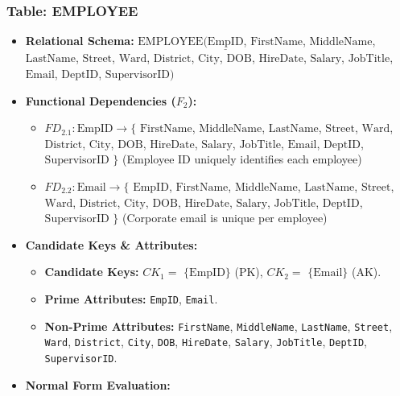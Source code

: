 \documentclass[a4paper,12pt]{report}
\begin{document}
\subsubsection{Table: EMPLOYEE}\label{table-employee}

\begin{itemize}
\item
  \textbf{Relational Schema:} \(\text{EMPLOYEE}(\underline{\text{EmpID}}\), \(\text{FirstName}\), \(\text{MiddleName}\), \(\text{LastName}\), \(\text{Street}\), \(\text{Ward}\), \(\text{District}\), \(\text{City}\), \(\text{DOB}\), \(\text{HireDate}\), \(\text{Salary}\), \(\text{JobTitle}\), \(\text{Email}\), \(\text{DeptID}\), \(\text{SupervisorID})\)
\item
  \textbf{Functional Dependencies (\(F_{2}\)):}

  \begin{itemize}
  \item
    \(FD_{2.1}: \text{EmpID} \rightarrow \{\) \(\text{FirstName}\), \(\text{MiddleName}\), \(\text{LastName}\), \(\text{Street}\), \(\text{Ward}\), \(\text{District}\), \(\text{City}\), \(\text{DOB}\), \(\text{HireDate}\), \(\text{Salary}\), \(\text{JobTitle}\), \(\text{Email}\), \(\text{DeptID}\), \(\text{SupervisorID}\) \(\}\) (Employee ID uniquely identifies each employee)
  \item
    \(FD_{2.2}: \text{Email} \rightarrow \{\) \(\text{EmpID}\), \(\text{FirstName}\), \(\text{MiddleName}\), \(\text{LastName}\), \(\text{Street}\), \(\text{Ward}\), \(\text{District}\), \(\text{City}\), \(\text{DOB}\), \(\text{HireDate}\), \(\text{Salary}\), \(\text{JobTitle}\), \(\text{DeptID}\), \(\text{SupervisorID}\) \(\}\) (Corporate email is unique per employee)
  \end{itemize}
\item
  \textbf{Candidate Keys \& Attributes:}

  \begin{itemize}
  \item
    \textbf{Candidate Keys:} \(CK_{1} =\) \(\{\text{EmpID}\}\) (PK), \(CK_{2} =\) \(\{\text{Email}\}\) (AK).
  \item
    \textbf{Prime Attributes:} \texttt{EmpID}, \texttt{Email}.
  \item
    \textbf{Non-Prime Attributes:} \texttt{FirstName}, \texttt{MiddleName}, \texttt{LastName}, \texttt{Street}, \texttt{Ward}, \texttt{District}, \texttt{City}, \texttt{DOB}, \texttt{HireDate}, \texttt{Salary}, \texttt{JobTitle}, \texttt{DeptID}, \texttt{SupervisorID}.
  \end{itemize}
\item
  \textbf{Normal Form Evaluation:}


\end{itemize}
\end{document}
